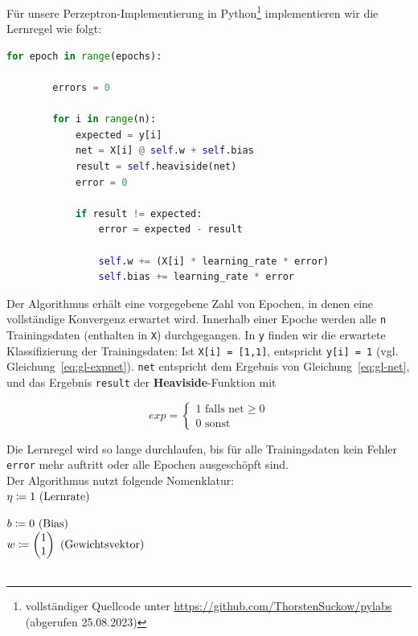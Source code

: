 \pagebreak
Für unsere Perzeptron-Implementierung in Python\footnote{
    vollständiger Quellcode unter \url{https://github.com/ThorstenSuckow/pylabs} (abgerufen 25.08.2023)
} implementieren wir die Lernregel wie folgt:


\begin{lstlisting}[language=Python]
    for epoch in range(epochs):

        errors = 0

        for i in range(n):
            expected = y[i]
            net = X[i] @ self.w + self.bias
            result = self.heaviside(net)
            error = 0

            if result != expected:
                error = expected - result

                self.w += (X[i] * learning_rate * error)
                self.bias += learning_rate * error
\end{lstlisting}

\noindent
Der Algorithmus erhält eine vorgegebene Zahl von Epochen, in denen eine vollständige Konvergenz erwartet wird.
Innerhalb einer Epoche werden alle \verb|n| Trainingsdaten (enthalten in \verb|X|) durchgegangen.
In \verb|y| finden wir die erwartete Klassifizierung der Trainingsdaten:
Ist \verb|X[i] = [1,1]|, entspricht \verb|y[i] = 1| (vgl. Gleichung~\ref{eq:gl-expnet}).
\verb|net| entspricht dem Ergebnis von Gleichung~\ref{eq:gl-net}, und das Ergebnis \verb|result| der \textbf{Heaviside}-Funktion mit

\begin{equation}
    exp = \begin{cases}
              1 \text{ falls } \text{net} \geq 0 \\
              0 \text{ sonst}
    \end{cases}
    \label{eq:gl-expnet}
\end{equation}

\noindent
Die Lernregel wird so lange durchlaufen, bis für alle Trainingsdaten kein Fehler \verb|error| mehr auftritt oder alle Epochen ausgeschöpft sind.\\

\noindent
Der Algorithmus nutzt folgende Nomenklatur:\\


$\eta \coloneqq 1 \space \space \text{ (Lernrate)}$

$b \coloneqq 0 \space \space \text{ (Bias)}$\\

$w \coloneqq \begin{pmatrix}
          1 \\
          1
\end{pmatrix}\space \space \text{ (Gewichtsvektor)}$
\\
\\

